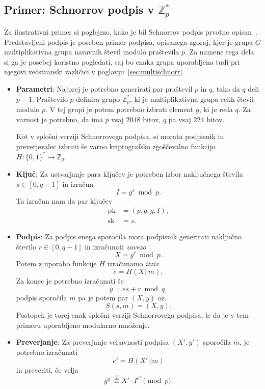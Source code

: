 \documentclass[isrm2, tisk]{fmfdelo}
\newcommand{\Z}{\mathbb Z}
\begin{document}
\subsection{Primer: Schnorrov podpis v \texorpdfstring{$\Z_p^*$}{Zp∗}}
Za ilustrativni primer si poglejmo, kako je bil Schnorrov podpis prvotno opisan~\cite{schnorr1989sig}.
Predstavljeni podpis je poseben primer podpisa, opisanega zgoraj, kjer je grupa $G$ multiplikativna
grupa naravnih števil modulo praštevila $p$. Za namene tega dela si ga je posebej koristno pogledati,
saj bo enaka grupa uporabljena tudi pri njegovi večstranski različici v poglavju~\ref{sec:multischnorr}.
\begin{itemize}
    \item \textbf{Parametri}:
    Najprej je potrebno generirati par praštevil $p$ in $q$, tako da $q$ deli $p - 1$. Praštevilo $p$
    definira grupo $\Z_p^*$, ki je multiplikativna grupa celih števil modulo $p$. V tej grupi je potem
    potrebno izbrati element $g$, ki je reda $q$. Za varnost je potrebno, da ima $p$ vsaj $2048$ bitov,
    $q$ pa vsaj $224$ bitov.

    Kot v splošni verziji Schnorrovega podpisa, si morata podpisnik in preverjevalec izbrati še varno
    kriptografsko zgoščevalno funkcijo $H : \{0, 1\}^* \rightarrow \Z_q$.

    \item \textbf{Ključ}:
    Za ustvarjanje para ključev je potreben izbor naključnega števila $s \in [0, q - 1]$
    in izračun 
    $$ 
    I = g^s \bmod p.
    $$
    Ta izračun nam da par ključev
    \begin{align*}
    \text{pk} &= (p, q, g, I), \\
    \text{sk} &= s.
    \end{align*}

    \item \textbf{Podpis}:
    Za podpis enega sporočila mora podpisnik generirati naključno število $r \in [0, q-1]$ in izračunati 
    \textit{zavezo} 
    $$ 
    X = g^r \bmod p.
    $$ 
    Potem z uporabo funkcije $H$ izračunamo \textit{izziv} 
    $$
    e = H(X || m),
    $$
    Za konec je potrebno izračunati še 
    $$ 
    y = es + r \bmod q, 
    $$
    podpis sporočila $m$ pa je potem par $(X, y)$ oz.\ 
    $$ 
    S(s, m) = (X, y).
    $$
    Postopek je torej enak splošni verziji Schnorrovega podpisa, le da je v tem primeru uporabljeno
    modularno množenje.

    \item \textbf{Preverjanje}:
    Za preverjanje veljavnosti podpisa $(X', y')$ sporočila $m$, je potrebno izračunati 
    $$ 
    e' = H(X' || m)
    $$
    in preveriti, če velja 
    \begin{equation}
        g^{y'} \stackrel{?}{\equiv} X' \cdot I^{e'} \pmod p. \label{eq:schnorr-ver}
    \end{equation}
\end{itemize}
\end{document}
